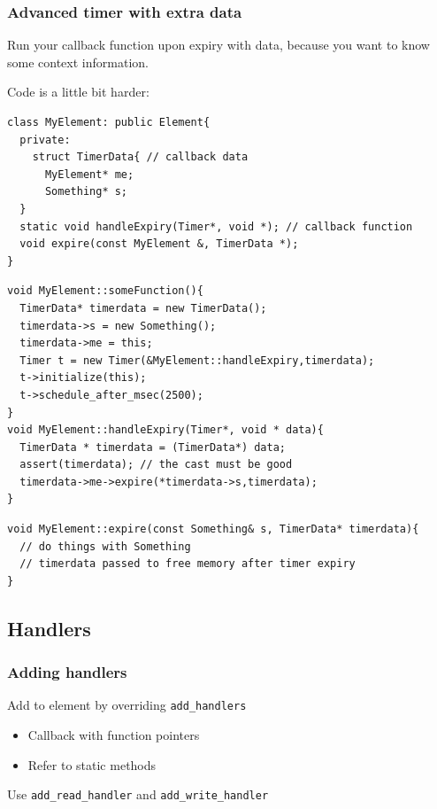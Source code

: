 \documentclass{beamer}
\begin{document}
\begin{frame}
\frametitle{Advanced timer with extra data}
Run your callback function upon expiry with data, because you want to know some context information.

Code is a little bit harder:
\begin{lstlisting}
class MyElement: public Element{
  private:
    struct TimerData{ // callback data
      MyElement* me;
      Something* s;
  }
  static void handleExpiry(Timer*, void *); // callback function
  void expire(const MyElement &, TimerData *);
}
\end{lstlisting}
\begin{lstlisting}
void MyElement::someFunction(){
  TimerData* timerdata = new TimerData();
  timerdata->s = new Something();
  timerdata->me = this;
  Timer t = new Timer(&MyElement::handleExpiry,timerdata);
  t->initialize(this);
  t->schedule_after_msec(2500);
}
void MyElement::handleExpiry(Timer*, void * data){
  TimerData * timerdata = (TimerData*) data;
  assert(timerdata); // the cast must be good
  timerdata->me->expire(*timerdata->s,timerdata);
}
\end{lstlisting}
\begin{lstlisting}
void MyElement::expire(const Something& s, TimerData* timerdata){
  // do things with Something
  // timerdata passed to free memory after timer expiry
}
\end{lstlisting}
\end{frame}



\subsection{Handlers} %
\label{sub:handlers}
\begin{frame}[fragile]
\frametitle{Adding handlers}
Add to element by overriding \lstinline!add_handlers!
\begin{itemize}
	\item Callback with function pointers
	\item Refer to static methods
\end{itemize}
Use \lstinline!add_read_handler! and \lstinline!add_write_handler!
\end{frame}
\end{document}
